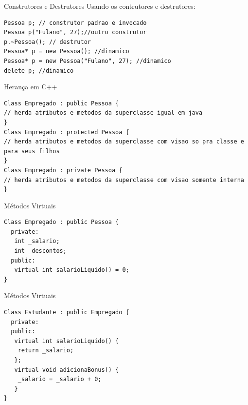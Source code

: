 \documentclass[12pt,table,xcolor={dvipsnames}]{beamer}
\begin{document}
\begin{frame}[fragile]{Construtores e Destrutores}
Usando os contrutores e destrutores:
\begin{lstlisting}
Pessoa p; // construtor padrao e invocado
Pessoa p("Fulano", 27);//outro construtor
p.~Pessoa(); // destrutor
Pessoa* p = new Pessoa(); //dinamico
Pessoa* p = new Pessoa("Fulano", 27); //dinamico
delete p; //dinamico
\end{lstlisting}
\end{frame}

\begin{frame}[fragile]{Herança em C++}
\begin{lstlisting}
Class Empregado : public Pessoa {
// herda atributos e metodos da superclasse igual em java
}
Class Empregado : protected Pessoa {
// herda atributos e metodos da superclasse com visao so pra classe e para seus filhos
}
Class Empregado : private Pessoa {
// herda atributos e metodos da superclasse com visao somente interna
}
\end{lstlisting}
\end{frame}

\begin{frame}[fragile]{Métodos Virtuais}
\begin{lstlisting}
Class Empregado : public Pessoa {
  private:
   int _salario;
   int _descontos;
  public:
   virtual int salarioLiquido() = 0;
}
\end{lstlisting}
\end{frame}

\begin{frame}[fragile]{Métodos Virtuais}
\begin{lstlisting}
Class Estudante : public Empregado {
  private:
  public:
   virtual int salarioLiquido() {
    return _salario;
   };
   virtual void adicionaBonus() {
    _salario = _salario + 0;
   }
}
\end{lstlisting}
\end{frame}
\end{document}
